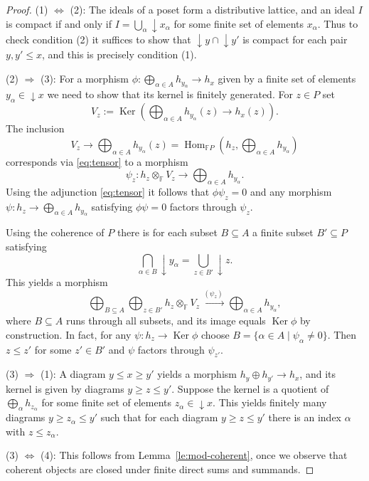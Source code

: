 \documentclass[a4paper]{amsart}
\theoremstyle{plain}
\theoremstyle{definition}
\theoremstyle{remark}
\numberwithin{equation}{section}
\newcommand{\Hom}{\operatorname{Hom}}
\newcommand{\Ker}{\operatorname{Ker}}
\newcommand{\lto}{\longrightarrow}
\newcommand{\xto}{\xrightarrow}
\def\bbF{\mathbb F}
\begin{document}
\begin{proof}
  (1) $\Leftrightarrow$ (2): The ideals of a poset form a distributive
  lattice, and an ideal $I$ is compact if and only if
  $I=\bigcup_\alpha\downarrow\! x_\alpha$ for some finite set of elements $x_\alpha$.
  Thus to check condition (2) it suffices to show that $\downarrow\!
  y\cap {\downarrow\! y'}$ is compact for each pair $y,y'\le x$, and
  this is precisely condition (1).

  (2) $\Rightarrow$ (3): For a morphism
  $\phi\colon \bigoplus_{\alpha\in A} h_{y_\alpha}\to h_x$ given by a finite set
  of elements $y_\alpha\in {\downarrow\! x}$ we need to show that its
  kernel is finitely generated.  For $z\in P$ set
  \[V_z:=\Ker\left( \bigoplus_{\alpha\in A} h_{y_\alpha}(z)\to
      h_x(z)\right).\] The inclusion
  \[V_z\lto \bigoplus_{\alpha\in A} h_{y_\alpha}(z)=\Hom_{\bbF P}(h_z,
    \bigoplus_{\alpha\in A} h_{y_\alpha})\] corresponds via \eqref{eq:tensor}
  to a morphism
  \[\psi_z\colon h_z\otimes_\bbF V_z\lto \bigoplus_{\alpha\in A}
  h_{y_\alpha}.\] Using the adjunction \eqref{eq:tensor} it follows that
  $\phi\psi_z=0$ and any morphism
  $\psi\colon h_z\to \bigoplus_{\alpha\in A} h_{y_\alpha}$ satisfying
  $\phi\psi=0$ factors through $\psi_z$.

  Using the coherence of $P$ there is for each subset $B\subseteq A$ a
  finite subset $B'\subseteq P$ satisfying
\[\bigcap_{\alpha\in B}\downarrow\!
  y_\alpha=\bigcup_{z\in B'}\downarrow\! z.\]
This yields a morphism
\[\bigoplus_{B\subseteq A}\bigoplus_{z\in B'}
  h_z\otimes_\bbF V_z\xto{\,(\psi_z)\,} \bigoplus_{\alpha\in A}
  h_{y_\alpha},\] where $B\subseteq A$ runs through all subsets, and its
image equals $\Ker\phi$ by construction. In fact, for any
$\psi\colon h_z\to\Ker\phi$ choose $B=\{\alpha\in A\mid\psi_\alpha\neq 0\}$. Then
$z\le z'$ for some $z'\in B'$ and $\psi$ factors through $\psi_{z'}$.

(3) $\Rightarrow$ (1): A diagram $y\le x\ge
y'$ yields a morphism $h_y\oplus h_{y'}\to h_x$, and its kernel is
given by diagrams $y\ge z\le y'$. Suppose the kernel is
a  quotient of $\bigoplus_\alpha h_{z_\alpha}$  for some finite set of elements
  $z_\alpha\in\downarrow\! x$.  This yields finitely many diagrams $y\ge z_\alpha\le y'$ such that for each
diagram $y\ge z\le y'$ there is an index $\alpha$ with  $z\le z_\alpha$. 

(3) $\Leftrightarrow$ (4): This follows from
Lemma~\ref{le:mod-coherent}, once we observe that coherent objects are
closed under finite direct sums and summands.
\end{proof}
\end{document}
